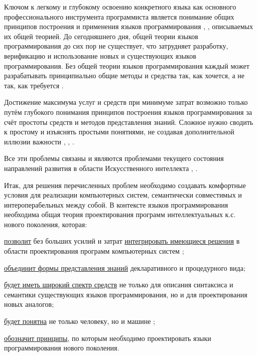 \begin{textitemize}
    \item Ключом к легкому и глубокому освоению конкретного языка как основного профессионального инструмента программиста является понимание общих принципов построения и применения языков программирования \cite{Turner2007}, \cite{Constanta2022}, описываемых их общей теорией. До сегодняшнего дня, общей теории языков программирования до сих пор не существует, что затрудняет разработку, верификацию и использование новых и существующих языков программирования. Без общей теории языков программирования каждый может разрабатывать принципиально общие методы и средства так, как хочется, а не так, как требуется \cite{Golenkov2012}.
    \item Достижение максимума услуг и средств при минимуме затрат возможно только путём глубокого понимания принципов построения языков программирования за счёт простоты средств и методов представления знаний. Сложное нужно сводить к простому и изъяснять простыми понятиями, не создавая дополнительной иллюзии важности \cite{Sellitto2022}, \cite{Chaparro2014}, \cite{Posnett2011}.
\end{textitemize}

Все эти проблемы связаны и являются проблемами текущего состояния направлений развития в области Искусственного интеллекта \cite{Skeeter2020}, \cite{Constanta2022}.

Итак, для решения перечисленных проблем необходимо создавать комфортные условия для реализации компьютерных систем, семантически совместимых и интероперабельных между собой. В контексте языков программирования необходима общая теория проектирования программ интеллектуальных к.с. нового поколения, которая:
\begin{textitemize}
    \item \underline{позволит} без больших усилий и затрат \underline{интегрировать имеющиеся решения} в области проектирования программ компьютерных систем \cite{Golenkov2019};
    \item \underline{объединит формы представления знаний} декларативного и процедурного вида;
    \item \underline{будет иметь широкий спектр средств} не только для описания синтаксиса и семантики существующих языков программирования, но и для проектирования новых аналогов;
    \item \underline{будет понятна} не только человеку, но и машине \cite{Zapata2010};
    \item \underline{обозначит принципы}, по которым необходимо проектировать языки программирования нового поколения.
\end{textitemize}


